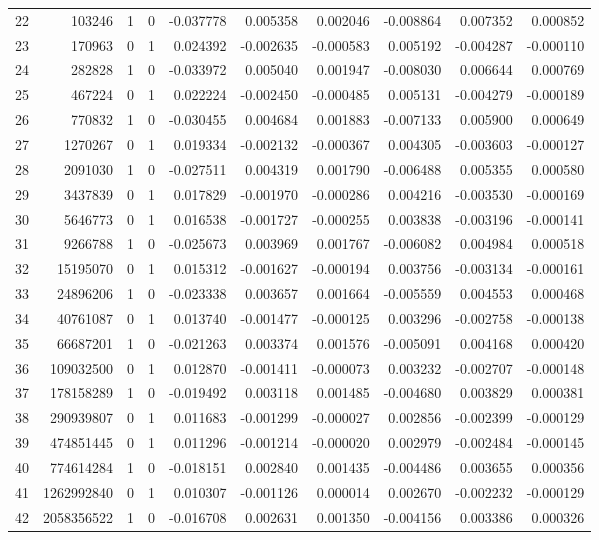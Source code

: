 \documentclass[12pt]{amsart}
\begin{document}
\begin{table}
{\begin{tabular}{|r|rrrrrrrrr|}
22 &103246 
&1&0
&-0.037778	&0.005358	&0.002046	
&-0.008864	&0.007352	&0.000852
\\
23 &170963 
&0&1
&0.024392	&-0.002635	&-0.000583	
&0.005192	&-0.004287	&-0.000110
\\
24 &282828 
&1&0
&-0.033972	&0.005040	&0.001947	
&-0.008030	&0.006644	&0.000769
\\
25 &467224 
&0&1
&0.022224	&-0.002450	&-0.000485	
&0.005131	&-0.004279	&-0.000189
\\
26 &770832 
&1&0
&-0.030455	&0.004684	&0.001883	
&-0.007133	&0.005900	&0.000649
\\
27 &1270267 
&0&1
&0.019334	&-0.002132	&-0.000367	
&0.004305	&-0.003603	&-0.000127
\\
28 &2091030 
&1&0
&-0.027511	&0.004319	&0.001790	
&-0.006488	&0.005355	&0.000580
\\
29 &3437839 
&0&1
&0.017829	&-0.001970	&-0.000286	
&0.004216	&-0.003530	&-0.000169
\\
30 &5646773 
&0&1
&0.016538	&-0.001727	&-0.000255	
&0.003838	&-0.003196	&-0.000141
\\
31 &9266788 
&1&0
&-0.025673	&0.003969	&0.001767	
&-0.006082	&0.004984	&0.000518
\\
32 &15195070 
&0&1
&0.015312	&-0.001627	&-0.000194	
&0.003756	&-0.003134	&-0.000161
\\
33 &24896206 
&1&0
&-0.023338	&0.003657	&0.001664	
&-0.005559	&0.004553	&0.000468
\\
34 &40761087 
&0&1
&0.013740	&-0.001477	&-0.000125	
&0.003296	&-0.002758	&-0.000138
\\
35 &66687201 
&1&0
&-0.021263	&0.003374	&0.001576	
&-0.005091	&0.004168	&0.000420
\\
36 &109032500 
&0&1
&0.012870	&-0.001411	&-0.000073	
&0.003232	&-0.002707	&-0.000148
\\
37 &178158289 
&1&0
&-0.019492	&0.003118	&0.001485	
&-0.004680	&0.003829	&0.000381
\\
38 &290939807 
&0&1
&0.011683	&-0.001299	&-0.000027	
&0.002856	&-0.002399	&-0.000129
\\
39 &474851445 
&0&1
&0.011296	&-0.001214	&-0.000020	
&0.002979	&-0.002484	&-0.000145
\\
40 &774614284 
&1&0
&-0.018151	&0.002840	&0.001435	
&-0.004486	&0.003655	&0.000356
\\
41 &1262992840 
&0&1
&0.010307	&-0.001126	&0.000014	
&0.002670	&-0.002232	&-0.000129
\\
42 &2058356522 
&1&0
&-0.016708	&0.002631	&0.001350	
&-0.004156	&0.003386	&0.000326
\\

\end{tabular}}
\end{table}
\end{document}
